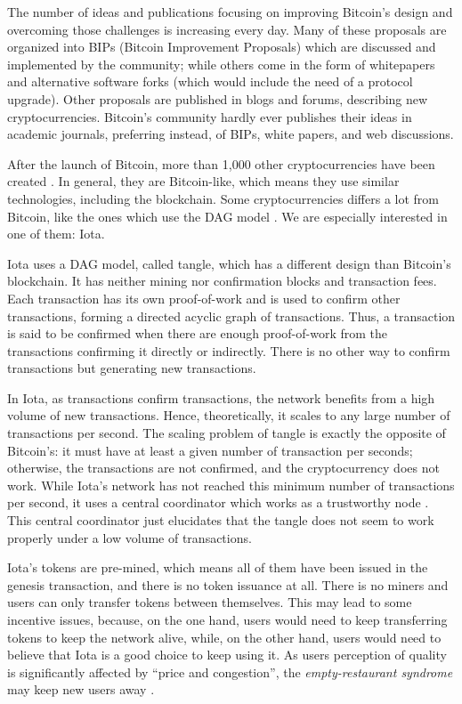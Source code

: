 The number of ideas and publications focusing on improving Bitcoin's design and overcoming those challenges is increasing every day. Many of these proposals are organized into BIPs (Bitcoin Improvement Proposals) which are discussed and implemented by the community; while others come in the form of whitepapers and alternative software forks (which would include the need of a protocol upgrade). Other proposals are published in blogs and forums, describing new cryptocurrencies. Bitcoin's community hardly ever publishes their ideas in academic journals, preferring instead, of BIPs, white papers, and web discussions.

After the launch of Bitcoin, more than 1,000 other cryptocurrencies have been created \citep{coinmarketcap}. In general, they are Bitcoin-like, which means they use similar technologies, including the blockchain. Some cryptocurrencies differs a lot from Bitcoin, like the ones which use the DAG model \citep{dagdiscussion2014, tangle2016, dagcoin2015, sompolinsky2013, lewenberg2015, vorick2015}. We are especially interested in one of them: Iota.

Iota uses a DAG model, called tangle, which has a different design than Bitcoin's blockchain. It has neither mining nor confirmation blocks and transaction fees. Each transaction has its own proof-of-work and is used to confirm other transactions, forming a directed acyclic graph of transactions. Thus, a transaction is said to be confirmed when there are enough proof-of-work from the transactions confirming it directly or indirectly. There is no other way to confirm transactions but generating new transactions.

In Iota, as transactions confirm transactions, the network benefits from a high volume of new transactions. Hence, theoretically, it scales to any large number of transactions per second. The scaling problem of tangle is exactly the opposite of Bitcoin's: it must have at least a given number of transaction per seconds; otherwise, the transactions are not confirmed, and the cryptocurrency does not work. While Iota's network has not reached this minimum number of transactions per second, it uses a central coordinator which works as a trustworthy node \citep{iotacoordinator}. This central coordinator just elucidates that the tangle does not seem to work properly under a low volume of transactions.

Iota's tokens are pre-mined, which means all of them have been issued in the genesis transaction, and there is no token issuance at all. There is no miners and users can only transfer tokens between themselves. This may lead to some incentive issues, because, on the one hand, users would need to keep transferring tokens to keep the network alive, while, on the other hand, users would need to believe that Iota is a good choice to keep using it. As users perception of quality is significantly affected by ``price and congestion'', the \emph{empty-restaurant syndrome} may keep new users away \citep{debo2010prices}.

